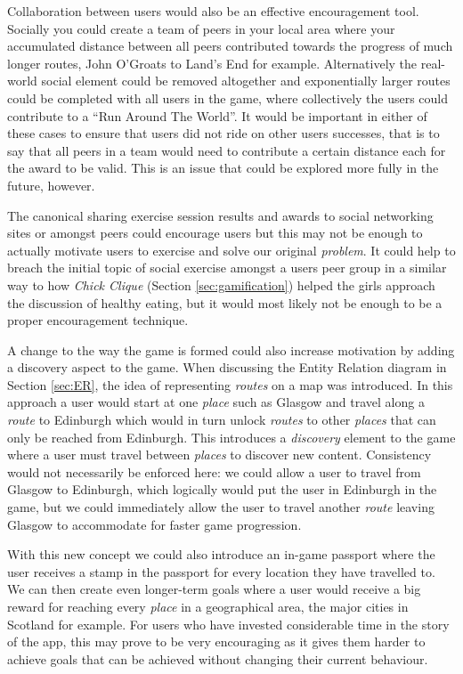 Collaboration between users would also be an effective encouragement
tool. Socially you could create a team of peers in your local area
where your accumulated distance between all peers contributed towards
the progress of much longer routes, John O'Groats  to Land's End for
example. Alternatively the real-world social element could be removed
altogether and exponentially larger routes could be completed with all
users in the game, where collectively the users could contribute to a
``Run Around The World''. It would be important in either of these
cases to ensure that users did not ride on other users successes, that
is to say that all peers in a team would need to contribute a
certain distance each for the award to be valid. This is an issue that
could be explored more fully in the future, however.

The canonical sharing exercise session results and awards to social
networking sites or amongst peers could encourage users but this may
not be enough to actually motivate users to exercise and solve our
original \emph{problem}. It could help to breach the initial topic of
social exercise amongst a users peer group in a similar way to how
\emph{Chick Clique} (Section \ref{sec:gamification}) helped the girls
approach the discussion of healthy eating, but it would most likely
not be enough to be a proper encouragement technique. 

A change to the way the game is formed could also increase motivation
by adding a discovery aspect to the game. When discussing the Entity
Relation diagram in Section \ref{sec:ER}, the idea of representing
\emph{routes} on a map was introduced. In this approach a user would
start at one \emph{place} such as Glasgow and travel along a
\emph{route} to Edinburgh which would in turn unlock \emph{routes} to
other \emph{places} that can only be reached from Edinburgh. This
introduces a \emph{discovery} element to the game where a user must
travel between \emph{places} to discover new content. Consistency
would not necessarily be enforced here: we could allow a user to
travel from Glasgow to Edinburgh, which logically would put the user
in Edinburgh in the game, but we could immediately allow the user to
travel another \emph{route} leaving Glasgow to accommodate for faster
game progression.

With this new concept we could also introduce an in-game passport
where the user receives a stamp in the passport for every location
they have travelled to. We can then create even longer-term goals
where a user would receive a big reward for reaching every
\emph{place} in a geographical area, the major cities in Scotland for
example. For users who have invested considerable time in the story of
the app, this may prove to be very encouraging as it gives them harder
to achieve goals that can be achieved without changing their current
behaviour. 

